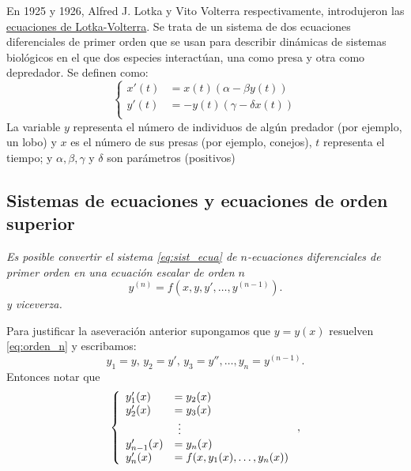 \begin{ejemplo}{}
 En 1925 y 1926, Alfred J. Lotka y Vito Volterra respectivamente, introdujeron
 las \href{https://es.wikipedia.org/wiki/Ecuaciones_Lotka%E2%80%93Volterra}{ecuaciones de Lotka-Volterra}.   Se trata de un sistema de dos ecuaciones diferenciales de primer orden que se usan para describir dinámicas de sistemas biológicos en el que dos especies interactúan, una como presa y otra como depredador. Se definen como:
\begin{equation}\label{eq:lotka_volterra}
\left\{
\begin{split}
 x'(t) &= x(t) ( \alpha - \beta  y(t) )\\
  y'(t)&=-y(t)(\gamma-\delta x(t))\\
\end{split}\right.
\end{equation}
La variable $y$ representa el número de individuos de algún predador (por ejemplo, un lobo) y $x$ es el número de sus presas (por ejemplo, conejos), $t$ representa el tiempo; y  $\alpha,\beta,\gamma$ y $\delta$ son parámetros (positivos)

\end{ejemplo}


\subsection{Sistemas de ecuaciones y ecuaciones de orden superior}

\emph{Es posible convertir el sistema \eqref{eq:sist_ecua} de $n$-ecuaciones diferenciales de primer orden  en una ecuación escalar de orden $n$
\begin{equation}\label{eq:orden_n}
y^{(n)}=f(x,y,y',\ldots,y^{(n-1)}).
\end{equation}
y viceverza.}

Para justificar la aseveración anterior supongamos que $y=y(x)$ resuelven  \eqref{eq:orden_n} y escribamos:
\[y_1=y,\, y_2=y',\,y_3=y'',\ldots, y_{n}=y^{(n-1)}.\]
Entonces notar que
\begin{equation}\label{eq:sist_ecua_conv}
\left\{
\begin{array}{l l l}
 y_1'(x)&=y_2(x)\\
  y_2'(x)&=y_3(x)\\
       &\,\,\vdots\\
  y_{n-1}'(x)&=y_n(x)\\
 y_n'(x)&=f(x,y_1(x),\ldots,y_n(x))\\
\end{array}\right.,
\end{equation}

